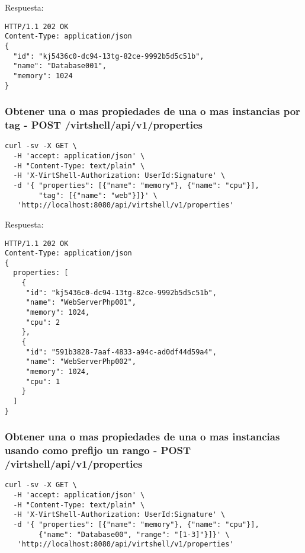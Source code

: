 \vspace{1cm}
Respuesta:
\vspace{1cm}

\begin{lstlisting}[style=json]
HTTP/1.1 202 OK
Content-Type: application/json
{
  "id": "kj5436c0-dc94-13tg-82ce-9992b5d5c51b",
  "name": "Database001",
  "memory": 1024
}
\end{lstlisting}

\subsubsection{Obtener una o mas propiedades de una o mas instancias por tag - POST /virtshell/api/v1/properties}

\begin{lstlisting}[style=json]
curl -sv -X GET \
  -H 'accept: application/json' \
  -H "Content-Type: text/plain" \
  -H 'X-VirtShell-Authorization: UserId:Signature' \
  -d '{ "properties": [{"name": "memory"}, {"name": "cpu"}],
        "tag": [{"name": "web"}]}' \
   'http://localhost:8080/api/virtshell/v1/properties'
\end{lstlisting}

\vspace{1cm}
Respuesta:
\vspace{1cm}

\begin{lstlisting}[style=json]
HTTP/1.1 202 OK
Content-Type: application/json
{
  properties: [
    {
     "id": "kj5436c0-dc94-13tg-82ce-9992b5d5c51b",
     "name": "WebServerPhp001",
     "memory": 1024,
     "cpu": 2
    },
    {
     "id": "591b3828-7aaf-4833-a94c-ad0df44d59a4",
     "name": "WebServerPhp002",
     "memory": 1024,
     "cpu": 1  
    }
  ]
}
\end{lstlisting}

\subsubsection{Obtener una o mas propiedades de una o mas instancias usando como prefijo un rango - POST /virtshell/api/v1/properties}

\begin{lstlisting}[style=json]
curl -sv -X GET \
  -H 'accept: application/json' \
  -H "Content-Type: text/plain" \
  -H 'X-VirtShell-Authorization: UserId:Signature' \
  -d '{ "properties": [{"name": "memory"}, {"name": "cpu"}],
        {"name": "Database00", "range": "[1-3]"}]}' \
   'http://localhost:8080/api/virtshell/v1/properties'
\end{lstlisting}


